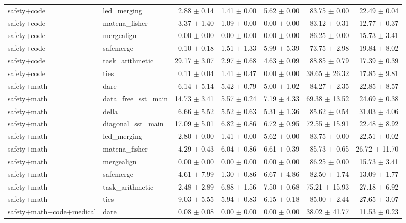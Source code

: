 \documentclass{article}
\begin{document}
\begin{table}[H]
{\begin{tabular}{llrrrrr}
safety+code & led\_merging & 2.88 $\pm$ 0.14 & 1.41 $\pm$ 0.00 & 5.62 $\pm$ 0.00 & 83.75 $\pm$ 0.00 & 22.49 $\pm$ 0.04 \\
safety+code & matena\_fisher & 3.37 $\pm$ 1.40 & 1.09 $\pm$ 0.00 & 0.00 $\pm$ 0.00 & 83.12 $\pm$ 0.31 & 12.77 $\pm$ 0.37 \\
safety+code & mergealign & 0.00 $\pm$ 0.00 & 0.00 $\pm$ 0.00 & 0.00 $\pm$ 0.00 & 86.25 $\pm$ 0.00 & 15.73 $\pm$ 3.41 \\
safety+code & safemerge & 0.10 $\pm$ 0.18 & 1.51 $\pm$ 1.33 & 5.99 $\pm$ 5.39 & 73.75 $\pm$ 2.98 & 19.84 $\pm$ 8.02 \\
safety+code & task\_arithmetic & 29.17 $\pm$ 3.07 & 2.97 $\pm$ 0.68 & 4.63 $\pm$ 0.09 & 88.85 $\pm$ 0.79 & 17.39 $\pm$ 0.39 \\
safety+code & ties & 0.11 $\pm$ 0.04 & 1.41 $\pm$ 0.47 & 0.00 $\pm$ 0.00 & 38.65 $\pm$ 26.32 & 17.85 $\pm$ 9.81 \\
safety+math & dare & 6.14 $\pm$ 5.14 & 5.42 $\pm$ 0.79 & 5.00 $\pm$ 1.02 & 84.27 $\pm$ 2.35 & 22.85 $\pm$ 8.57 \\
safety+math & data\_free\_sst\_main & 14.73 $\pm$ 3.41 & 5.57 $\pm$ 0.24 & 7.19 $\pm$ 4.33 & 69.38 $\pm$ 13.52 & 24.69 $\pm$ 0.38 \\
safety+math & della & 6.66 $\pm$ 5.52 & 5.52 $\pm$ 0.63 & 5.31 $\pm$ 1.36 & 85.62 $\pm$ 0.54 & 31.03 $\pm$ 4.06 \\
safety+math & diagonal\_sst\_main & 17.09 $\pm$ 5.01 & 6.82 $\pm$ 0.86 & 6.72 $\pm$ 0.95 & 72.55 $\pm$ 15.91 & 22.48 $\pm$ 8.92 \\
safety+math & led\_merging & 2.80 $\pm$ 0.00 & 1.41 $\pm$ 0.00 & 5.62 $\pm$ 0.00 & 83.75 $\pm$ 0.00 & 22.51 $\pm$ 0.02 \\
safety+math & matena\_fisher & 4.29 $\pm$ 0.43 & 6.04 $\pm$ 0.86 & 6.61 $\pm$ 0.39 & 85.73 $\pm$ 0.65 & 26.72 $\pm$ 11.70 \\
safety+math & mergealign & 0.00 $\pm$ 0.00 & 0.00 $\pm$ 0.00 & 0.00 $\pm$ 0.00 & 86.25 $\pm$ 0.00 & 15.73 $\pm$ 3.41 \\
safety+math & safemerge & 4.61 $\pm$ 7.99 & 1.30 $\pm$ 0.86 & 6.67 $\pm$ 4.86 & 82.50 $\pm$ 1.74 & 13.09 $\pm$ 1.77 \\
safety+math & task\_arithmetic & 2.48 $\pm$ 2.89 & 6.88 $\pm$ 1.56 & 7.50 $\pm$ 0.68 & 75.21 $\pm$ 15.93 & 27.18 $\pm$ 6.92 \\
safety+math & ties & 9.03 $\pm$ 5.55 & 5.94 $\pm$ 0.83 & 6.15 $\pm$ 0.18 & 85.00 $\pm$ 2.44 & 27.65 $\pm$ 3.07 \\
safety+math+code+medical & dare & 0.08 $\pm$ 0.08 & 0.00 $\pm$ 0.00 & 0.00 $\pm$ 0.00 & 38.02 $\pm$ 41.77 & 11.53 $\pm$ 0.23 \\

\end{tabular}}
\end{table}
\end{document}
